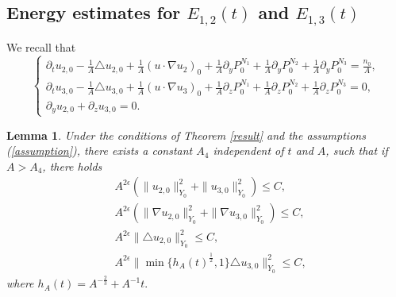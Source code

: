 \documentclass[12pt, reqno]{amsart}
\newtheorem{lemma}{Lemma}[section]
\numberwithin{equation}{section}
\begin{document}
	\subsection{Energy estimates for $E_{1,2}(t)$ and $E_{1,3}(t)$}
	We recall that 
	\begin{equation}\label{u_zero_1}
		\left\{
		\begin{array}{lr}
			\partial_tu_{2,0}-\frac{1}{A}\triangle u_{2,0}
			+\frac{1}{A}(u\cdot\nabla u_{2})_0
			+\frac{1}{A}\partial_yP^{N_1}_0
			+\frac{1}{A}\partial_y P^{N_2}_0+\frac{1}{A}\partial_y P^{N_3}_0=\frac{n_0}{A}, \\
			\partial_tu_{3,0}-\frac{1}{A}\triangle u_{3,0}
			+\frac{1}{A}(u\cdot\nabla u_3)_0
			+\frac{1}{A}\partial_zP^{N_1}_0
			+\frac{1}{A}\partial_z P^{N_2}_0
			+\frac{1}{A}\partial_z P^{N_3}_0=0, \\
			\partial_yu_{2,0}+\partial_zu_{3,0}=0.
		\end{array}
		\right.
	\end{equation}	
	\begin{lemma}\label{lemma_u23_1}
		Under the conditions of Theorem \ref{result} and the assumptions (\ref{assumption}),
		there exists a constant $A_4$ independent of $t$ and $A$, such that if $A>A_4$, 
		there holds 
		\begin{equation}\label{eq:u20u30}
			\begin{aligned}
				&A^{2\epsilon}(\|u_{2,0}\|^2_{Y_0}+\|u_{3,0}\|^2_{Y_0})\leq C,\\
				&A^{2\epsilon}(\|\nabla u_{2,0}\|^2_{Y_0}+\|\nabla u_{3,0}\|^2_{Y_0})\leq C,\\
				&A^{2\epsilon}\|\triangle u_{2,0}\|^2_{Y_0}\leq C,\\
				&A^{2\epsilon}\|\min\{h_A(t)^{\frac{1}{2}},1\}\triangle u_{3,0}\|^2_{Y_0}\leq C,
			\end{aligned}
		\end{equation}
		where $h_A(t)=A^{-\frac{2}{3}}+A^{-1}t.$
	\end{lemma}
\end{document}
